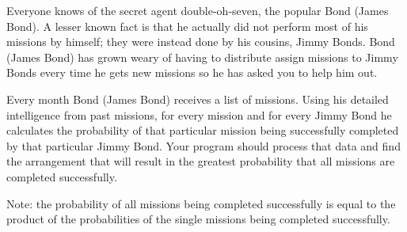 Everyone knows of the secret agent double-oh-seven, the popular Bond (James Bond). A lesser known fact is that he actually did not perform most of his missions by himself; they were instead done by his cousins, Jimmy Bonds. Bond (James Bond) has grown weary of having to distribute assign missions to Jimmy Bonds every time he gets new missions so he has asked you to help him out.

Every month Bond (James Bond) receives a list of missions. Using his detailed intelligence from past missions, for every mission and for every Jimmy Bond he calculates the probability of that particular mission being successfully completed by that particular Jimmy Bond. Your program should process that data and find the arrangement that will result in the greatest probability that all missions are completed successfully.

Note: the probability of all missions being completed successfully is equal to the product of the probabilities of the single missions being completed successfully.